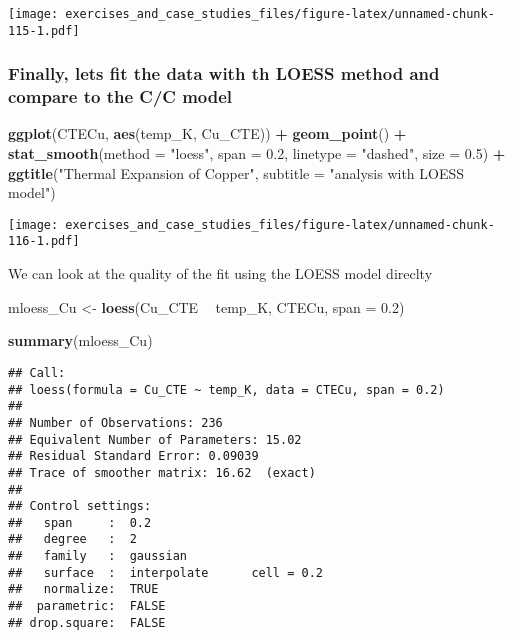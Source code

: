 \documentclass[]{book}
\newenvironment{Shaded}{\begin{snugshade}}{\end{snugshade}}
\newcommand{\DataTypeTok}[1]{\textcolor[rgb]{0.13,0.29,0.53}{#1}}
\newcommand{\FloatTok}[1]{\textcolor[rgb]{0.00,0.00,0.81}{#1}}
\newcommand{\KeywordTok}[1]{\textcolor[rgb]{0.13,0.29,0.53}{\textbf{#1}}}
\newcommand{\NormalTok}[1]{#1}
\newcommand{\OperatorTok}[1]{\textcolor[rgb]{0.81,0.36,0.00}{\textbf{#1}}}
\newcommand{\StringTok}[1]{\textcolor[rgb]{0.31,0.60,0.02}{#1}}
\theoremstyle{definition}
\theoremstyle{definition}
\theoremstyle{definition}
\theoremstyle{remark}
\begin{document}
\texttt{[image: exercises\_and\_case\_studies\_files/figure-latex/unnamed-chunk-115-1.pdf]}

\hypertarget{finally-lets-fit-the-data-with-th-loess-method-and-compare-to-the-cc-model}{%
\subsubsection{Finally, lets fit the data with th LOESS method and
compare to the C/C
model}\label{finally-lets-fit-the-data-with-th-loess-method-and-compare-to-the-cc-model}}

\begin{Shaded}
\begin{Highlighting}[]
\KeywordTok{ggplot}\NormalTok{(CTECu, }\KeywordTok{aes}\NormalTok{(temp_K, Cu_CTE)) }\OperatorTok{+}
\StringTok{  }\KeywordTok{geom_point}\NormalTok{() }\OperatorTok{+}\StringTok{ }
\StringTok{  }\KeywordTok{stat_smooth}\NormalTok{(}\DataTypeTok{method =} \StringTok{"loess"}\NormalTok{, }\DataTypeTok{span =} \FloatTok{0.2}\NormalTok{, }\DataTypeTok{linetype =} \StringTok{"dashed"}\NormalTok{, }\DataTypeTok{size =} \FloatTok{0.5}\NormalTok{) }\OperatorTok{+}
\StringTok{  }\KeywordTok{ggtitle}\NormalTok{(}\StringTok{"Thermal Expansion of Copper"}\NormalTok{, }\DataTypeTok{subtitle =} \StringTok{"analysis with LOESS model"}\NormalTok{)}
\end{Highlighting}
\end{Shaded}

\texttt{[image: exercises\_and\_case\_studies\_files/figure-latex/unnamed-chunk-116-1.pdf]}

We can look at the quality of the fit using the LOESS model direclty

\begin{Shaded}
\begin{Highlighting}[]
\NormalTok{mloess_Cu <-}\StringTok{ }\KeywordTok{loess}\NormalTok{(Cu_CTE }\OperatorTok{~}\StringTok{ }\NormalTok{temp_K, CTECu, }\DataTypeTok{span =} \FloatTok{0.2}\NormalTok{)}

\KeywordTok{summary}\NormalTok{(mloess_Cu)}
\end{Highlighting}
\end{Shaded}

\begin{verbatim}
## Call:
## loess(formula = Cu_CTE ~ temp_K, data = CTECu, span = 0.2)
## 
## Number of Observations: 236 
## Equivalent Number of Parameters: 15.02 
## Residual Standard Error: 0.09039 
## Trace of smoother matrix: 16.62  (exact)
## 
## Control settings:
##   span     :  0.2 
##   degree   :  2 
##   family   :  gaussian
##   surface  :  interpolate      cell = 0.2
##   normalize:  TRUE
##  parametric:  FALSE
## drop.square:  FALSE
\end{verbatim}
\end{document}
